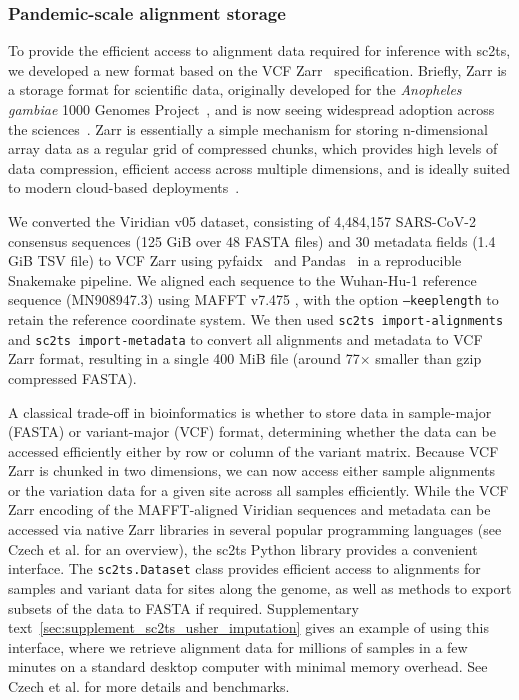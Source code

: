 \documentclass[12pt]{article}
\begin{document}
\subsubsection*{Pandemic-scale alignment storage}
To provide the efficient access to alignment data required for inference with sc2ts,
we developed a new format based on the VCF Zarr~\cite{Czech2025} specification.
Briefly, Zarr is a storage format for scientific data,
originally developed for the
\textit{Anopheles gambiae}
1000 Genomes Project~\cite{Anopheles2017genetic}, and
is now seeing widespread adoption across the
sciences~\cite{Abernathey2021cloud,Moore2021ome,Gowan2022using,
Dhapola2022scarf,Virshup2023scverse,Baker2023emobject,
Marconato2024spatialdata,Ruan2024image}.
Zarr is essentially a simple mechanism for storing n-dimensional array
data as a regular grid of compressed chunks, which provides
high levels of data compression, efficient access across multiple
dimensions, and is ideally suited to modern cloud-based
deployments~\cite{Czech2025}.

We converted the Viridian v05 dataset\cite{Hunt2026}, consisting of 4,484,157 SARS-CoV-2
consensus sequences (125 GiB over 48 FASTA files) and 30 metadata fields (1.4
GiB TSV file) to VCF Zarr using
pyfaidx~\cite{Shirley2015efficient} and Pandas~\cite{Mckinney2010data} in a
reproducible Snakemake\cite{Koster2012snakemake} pipeline.
We aligned each sequence to the Wuhan-Hu-1 reference sequence (MN908947.3) using
MAFFT v7.475 \cite{Katoh2013},
with the option \texttt{--keeplength} to retain the reference coordinate system.
We then used \texttt{sc2ts import-alignments} and
\texttt{sc2ts import-metadata} to convert all alignments and metadata to VCF
Zarr format, resulting in a single 400 MiB file
(around 77$\times$ smaller than gzip compressed FASTA\cite{Czech2025}).

A classical trade-off in bioinformatics is whether to store data
in sample-major (FASTA) or variant-major (VCF) format, determining
whether the data can be accessed efficiently either by row or column
of the variant matrix. Because VCF Zarr is chunked in two dimensions,
we can now access either sample alignments or the variation
data for a given site across all samples efficiently.
While the VCF Zarr encoding of the MAFFT-aligned Viridian sequences
and metadata can be accessed via native Zarr libraries in several
popular programming languages (see Czech et al.\cite{Czech2025}
for an overview), the sc2ts Python library provides a convenient interface.
The \texttt{sc2ts.Dataset}
class provides efficient access to alignments for samples and
variant data for sites along the genome, as well as methods to export
subsets of the data to FASTA if required.
Supplementary text~\ref{sec:supplement_sc2ts_usher_imputation} gives an example
of using this interface, where we retrieve alignment data for millions
of samples in a few minutes on a standard desktop computer with minimal
memory overhead. See Czech et al.\cite{Czech2025} for more details
and benchmarks.
\end{document}

